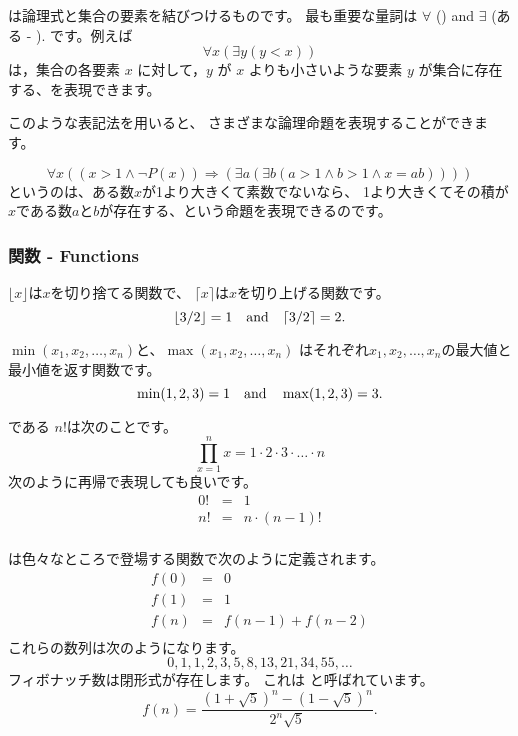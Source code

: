 
は論理式と集合の要素を結びつけるものです。
最も重要な量詞は
$\forall$ () and $\exists$ (ある - ).
です。例えば
\[\forall x (\exists y (y < x))\]
は，集合の各要素 $x$ に対して，$y$ が $x$ よりも小さいような要素 $y$ が集合に存在する、を表現できます。

このような表記法を用いると、
さまざまな論理命題を表現することができます。

\[\forall x ((x>1 \land \lnot P(x)) \Rightarrow (\exists a (\exists b (a > 1 \land b > 1 \land x = ab))))\]
というのは、ある数$x$が1より大きくて素数でないなら、
1より大きくてその積が$x$である数$a$と$b$が存在する、という命題を表現できるのです。

\subsubsection{関数 - Functions}

$\lfloor x \rfloor$は$x$を切り捨てる関数で、
$\lceil x \rceil$は$x$を切り上げる関数です。
\[ \lfloor 3/2 \rfloor = 1 \hspace{10px} \textrm{and} \hspace{10px} \lceil 3/2 \rceil = 2.\]

$\min(x_1,x_2,\ldots,x_n)$と、$\max(x_1,x_2,\ldots,x_n)$
はそれぞれ$x_1,x_2,\ldots,x_n$の最大値と最小値を返す関数です。
\[ \min(1,2,3)=1 \hspace{10px} \textrm{and} \hspace{10px} \max(1,2,3)=3.\]


 である $n!$は次のことです。
\[\prod_{x=1}^n x = 1 \cdot 2 \cdot 3 \cdot \ldots \cdot n\]
次のように再帰で表現しても良いです。
\[
\begin{array}{lcl}
0! & = & 1 \\
n! & = & n \cdot (n-1)! \\
\end{array}
\]


は色々なところで登場する関数で次のように定義されます。
\[
\begin{array}{lcl}
f(0) & = & 0 \\
f(1) & = & 1 \\
f(n) & = & f(n-1)+f(n-2) \\
\end{array}
\]
これらの数列は次のようになります。
\[0, 1, 1, 2, 3, 5, 8, 13, 21, 34, 55, \ldots\]
フィボナッチ数は閉形式が存在します。
これは 
と呼ばれています。
\[f(n)=\frac{(1 + \sqrt{5})^n - (1-\sqrt{5})^n}{2^n \sqrt{5}}.\]

